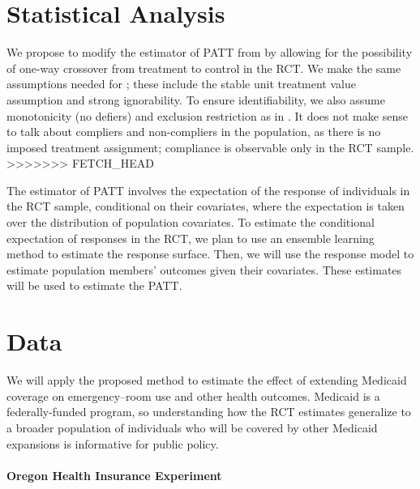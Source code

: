 \documentclass{article}
\begin{document}
\section{Statistical Analysis}
We propose to modify the estimator of PATT from \cite{Hartman} by allowing for the possibility of one-way crossover from treatment to control in the RCT.  We make the same assumptions needed for \cite{Hartman}; these include the stable unit treatment value assumption and strong ignorability.  To ensure identifiability, we also assume monotonicity (no defiers) and exclusion restriction as in \cite{Angrist1996}.  It does not make sense to talk about compliers and non-compliers in the population, as there is no imposed treatment assignment; compliance is observable only in the RCT sample.   \\
>>>>>>> FETCH_HEAD

The estimator of PATT involves the expectation of the response of individuals in the RCT sample, conditional on their covariates, where the expectation is taken over the distribution of population covariates.  To estimate the conditional expectation of responses in the RCT, we plan to use an ensemble learning method to estimate the response surface.  Then, we will use the response model to estimate population members' outcomes given their covariates.  These estimates will be used to estimate the PATT.

\section{Data}

We will apply the proposed method to estimate the effect of extending Medicaid coverage on emergency--room use and other health outcomes.  Medicaid is a federally-funded program, so understanding how the RCT estimates generalize to a broader population of individuals who will be covered by other Medicaid expansions is informative for public policy. 

\paragraph{Oregon Health Insurance Experiment}
\end{document}
